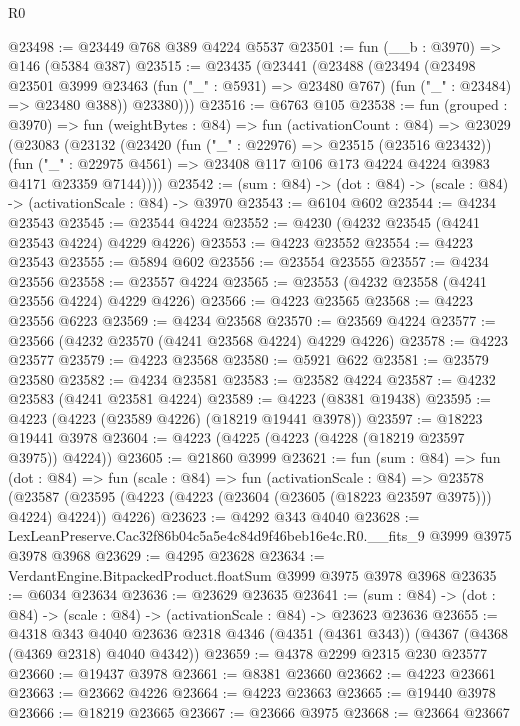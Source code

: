 \begin{lexlean}{R0}
\begin{coremodule}
@23498 := @23449 @768 @389 @4224 @5537
@23501 := fun (__b : @3970) => @146 (@5384 @387)
@23515 := @23435
    (@23441
      (@23488
        (@23494
          (@23498
            @23501
            @3999
            @23463
            (fun ("_" : @5931) => @23480 @767)
            (fun ("_" : @23484) => @23480 @388))
          @23380)))
@23516 := @6763 @105
@23538 := fun (grouped : @3970) =>
  fun (weightBytes : @84) =>
  fun (activationCount : @84) =>
  @23029
    (@23083
      (@23132
        (@23420
          (fun ("_" : @22976) => @23515 (@23516 @23432))
          (fun ("_" : @22975 @4561) =>
          @23408 @117 @106 @173 @4224 @4224 @3983 @4171 @23359 @7144))))
@23542 := (sum : @84) -> (dot : @84) -> (scale : @84) -> (activationScale : @84) -> @3970
@23543 := @6104 @602
@23544 := @4234 @23543
@23545 := @23544 @4224
@23552 := @4230 (@4232 @23545 (@4241 @23543 @4224) @4229 @4226)
@23553 := @4223 @23552
@23554 := @4223 @23543
@23555 := @5894 @602
@23556 := @23554 @23555
@23557 := @4234 @23556
@23558 := @23557 @4224
@23565 := @23553 (@4232 @23558 (@4241 @23556 @4224) @4229 @4226)
@23566 := @4223 @23565
@23568 := @4223 @23556 @6223
@23569 := @4234 @23568
@23570 := @23569 @4224
@23577 := @23566 (@4232 @23570 (@4241 @23568 @4224) @4229 @4226)
@23578 := @4223 @23577
@23579 := @4223 @23568
@23580 := @5921 @622
@23581 := @23579 @23580
@23582 := @4234 @23581
@23583 := @23582 @4224
@23587 := @4232 @23583 (@4241 @23581 @4224)
@23589 := @4223 (@8381 @19438)
@23595 := @4223 (@4223 (@23589 @4226) (@18219 @19441 @3978))
@23597 := @18223 @19441 @3978
@23604 := @4223 (@4225 (@4223 (@4228 (@18219 @23597 @3975)) @4224))
@23605 := @21860 @3999
@23621 := fun (sum : @84) =>
  fun (dot : @84) =>
  fun (scale : @84) =>
  fun (activationScale : @84) =>
  @23578 (@23587 (@23595 (@4223 (@4223 (@23604 (@23605 (@18223 @23597 @3975))) @4224) @4224)) @4226)
@23623 := @4292 @343 @4040
@23628 := LexLeanPreserve.Cac32f86b04c5a5e4c84d9f46beb16e4c.R0.__fits_9 @3999 @3975 @3978 @3968
@23629 := @4295 @23628
@23634 := VerdantEngine.BitpackedProduct.floatSum @3999 @3975 @3978 @3968
@23635 := @6034 @23634
@23636 := @23629 @23635
@23641 := (sum : @84) -> (dot : @84) -> (scale : @84) -> (activationScale : @84) -> @23623 @23636
@23655 := @4318
    @343
    @4040
    @23636
    @2318
    @4346
    (@4351 (@4361 @343))
    (@4367 (@4368 (@4369 @2318) @4040 @4342))
@23659 := @4378 @2299 @2315 @230 @23577
@23660 := @19437 @3978
@23661 := @8381 @23660
@23662 := @4223 @23661
@23663 := @23662 @4226
@23664 := @4223 @23663
@23665 := @19440 @3978
@23666 := @18219 @23665
@23667 := @23666 @3975
@23668 := @23664 @23667

\end{coremodule}
\end{lexlean}
